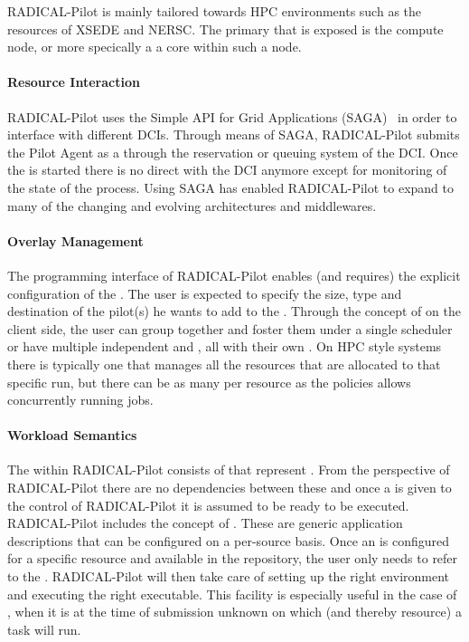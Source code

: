 \documentclass{sig-alternate}
\begin{document}
RADICAL-Pilot is mainly tailored towards HPC environments such as the resources
of XSEDE and NERSC\cite{}.
The primary  that is exposed is the compute node, or more
specically a a core within such a node.

\paragraph{Resource Interaction}

RADICAL-Pilot uses the Simple API for Grid Applications
(SAGA)~\cite{ogf-gfd-90, sagastuff} in order to interface with different DCIs.
Through means of SAGA, RADICAL-Pilot submits the Pilot Agent as a 
through the reservation or queuing system of the DCI.
Once the  is started there is no direct  with the DCI anymore except for monitoring of the state of the
 process.
Using SAGA has enabled RADICAL-Pilot to expand to many of the changing and
evolving architectures and middlewares.

\paragraph{Overlay Management}

The programming interface of RADICAL-Pilot enables (and requires) the explicit
configuration of the .
The user is expected to specify the size, type and destination of the pilot(s)
he wants to add to the .
Through the concept of  on the client side, the user can
group \pilots together and foster them under a single scheduler or have
multiple independent  and \pilots, all with their own
.
On HPC style systems there is typically one \pilot that manages all the
resources that are allocated to that specific run, but there can be as many
\pilots per resource as the policies allows concurrently running jobs.

\paragraph{Workload Semantics}

The  within RADICAL-Pilot consists of 
that represent .
From the perspective of RADICAL-Pilot there are no dependencies between these
 and once a  is given to the control
of RADICAL-Pilot it is assumed to be ready to be executed.
RADICAL-Pilot includes the concept of .
These are generic application descriptions that can be configured on a
per-source basis.
Once an  is configured for a specific resource and
available in the repository, the user only needs to refer to the .
RADICAL-Pilot will then take care of setting up the right environment and
executing the right executable.
This facility is especially useful in the case of , when it
is at the time of submission unknown on which \pilot (and thereby resource) a
task will run.
\end{document}
